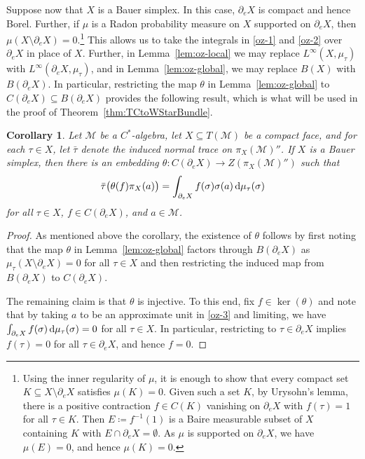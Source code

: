 \documentclass[a4paper,11pt]{amsart}
\newtheorem{corollary}[theorem]{Corollary}
\theoremstyle{definition}
\numberwithin{equation}{section}
\numberwithin{theorem}{section}
\begin{document}
Suppose now that $X$ is a Bauer simplex.  In this case, $\partial_e X$ is compact and hence Borel.  Further, if $\mu$ is a Radon probability measure on $X$ supported on $\partial_e X$, then $\mu(X \setminus \partial_e X) = 0$.\footnote{Using the inner regularity of $\mu$, it is enough to show that every compact set $K \subseteq X \setminus \partial_e X$ satisfies $\mu(K) = 0$.  
Given such a set $K$, by Urysohn's lemma, there is a positive contraction $f \in C(K)$ vanishing on $\partial_e X$ with $f(\tau) = 1$ for all $\tau \in K$.  Then $E \coloneqq f^{-1}(1)$ is a Baire measurable subset of $X$ containing $K$ with $E \cap \partial_e X = \emptyset$.  As $\mu$ is supported on $\partial_e X$, we have $\mu(E) = 0$, and hence $\mu(K) = 0$.}  This allows us to take the integrals in \eqref{oz-1} and \eqref{oz-2} over $\partial_e X$ in place of $X$.  Further, in Lemma~\ref{lem:oz-local} we may replace $L^\infty(X, \mu_\tau)$ with $L^\infty(\partial_e X, \mu_\tau)$, and in Lemma~\ref{lem:oz-global}, we may replace $B(X)$ with $B(\partial_e X)$.  In particular, restricting the map $\theta$ in Lemma~\ref{lem:oz-global} to $C(\partial_e X) \subseteq B(\partial_e X)$ provides the following result, which is what will be used in the proof of Theorem~\ref{thm:TCtoWStarBundle}.

\begin{corollary}\label{cor:oz-continuous}
    Let $\mathcal M$ be a $C^*$-algebra, let $X \subseteq T(\mathcal M)$ be a compact face, and for each $\tau \in X$, let $\bar \tau$ denote the induced normal trace on $\pi_X(\mathcal M)''$.  If $X$ is a Bauer simplex, then there is an embedding $\theta \colon C(\partial_e X) \rightarrow Z(\pi_X(\mathcal M)'')$ such that 
    \begin{equation}\label{oz-3}
        \bar\tau\big(\theta(f)\pi_X(a)\big) = \int_{\partial_e X} f(\sigma) \sigma(a) \,{\rm d}\mu_\tau(\sigma)
    \end{equation}
    for all $\tau \in X$, $f \in C(\partial_e X)$, and $a \in \mathcal M$.
\end{corollary}

\begin{proof}
    As mentioned above the corollary, the existence of $\theta$ follows by first noting that the map $\theta$ in Lemma~\ref{lem:oz-global} factors through $B(\partial_e X)$ as $\mu_\tau(X \setminus \partial_e X) = 0$ for all $\tau \in X$ and then restricting the induced map from $B(\partial_e X)$ to $C(\partial_e X)$.  
    
    The remaining claim is that $\theta$ is injective.  To this end, fix $f \in \ker(\theta)$ and note that by taking $a$ to be an approximate unit in \eqref{oz-3} and limiting, we have $\int_{\partial_e X} f(\sigma) \, {\rm d} \mu_\tau(\sigma) = 0$ for all $\tau \in X$.  In particular, restricting to $\tau \in \partial_e X$ implies $f(\tau) = 0$ for all $\tau \in \partial_e X$, and hence $f = 0$.
\end{proof}
\end{document}
